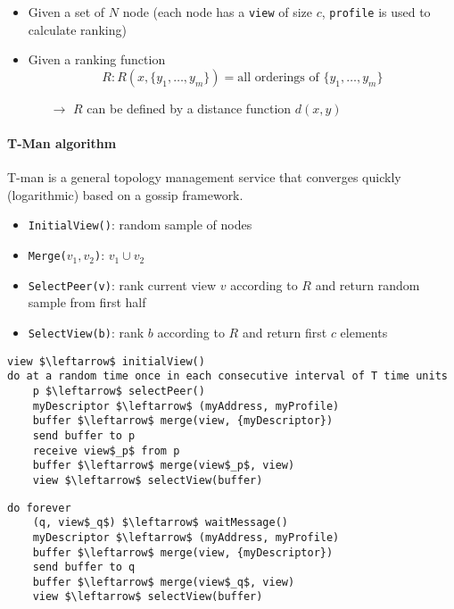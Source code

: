 \begin{itemize}
\item Given a set of $N$ node (each node has a \texttt{view} of size $c$, \texttt{profile} is used
to calculate ranking)
\item Given a ranking function
    $$R: R(x, \{ y_1,\ldots,y_m \}) = {\textrm{all orderings of } \{y_1,\ldots,y_m\}} $$
\begin{itemize}
\item[$\to$] $R$ can be defined by a distance function $d(x,y)$
\end{itemize}
\end{itemize}

\paragraph{T-Man algorithm}

T-man is a general topology management service that converges quickly
(logarithmic) based on a gossip framework.

\begin{itemize}
    \item \texttt{InitialView()}: random sample of nodes
    \item \texttt{Merge($v_1, v_2$)}: $v_1 \cup v_2$
    \item \texttt{SelectPeer(v)}: rank current view $v$ according to $R$ and return
    random sample from first half
    \item \texttt{SelectView(b)}: rank $b$ according to $R$ and return first $c$ elements
\end{itemize}

\begin{lstlisting}[caption={Active thread}, mathescape]
view $\leftarrow$ initialView()
do at a random time once in each consecutive interval of T time units
    p $\leftarrow$ selectPeer()
    myDescriptor $\leftarrow$ (myAddress, myProfile)
    buffer $\leftarrow$ merge(view, {myDescriptor})
    send buffer to p
    receive view$_p$ from p
    buffer $\leftarrow$ merge(view$_p$, view)
    view $\leftarrow$ selectView(buffer)
\end{lstlisting}

\begin{lstlisting}[caption={Passive thread}, mathescape]
do forever
    (q, view$_q$) $\leftarrow$ waitMessage()
    myDescriptor $\leftarrow$ (myAddress, myProfile)
    buffer $\leftarrow$ merge(view, {myDescriptor})
    send buffer to q
    buffer $\leftarrow$ merge(view$_q$, view)
    view $\leftarrow$ selectView(buffer)
\end{lstlisting}

